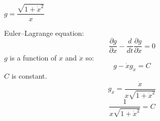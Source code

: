 $g = \dfrac{\sqrt{1+\dot x^2}}{x}$


Euler–Lagrange equation:
$$\dfrac{\partial g}{\partial x} - \dfrac{d}{dt}\dfrac{\partial g}{\partial \dot x} = 0$$
$g$ is a function of $x$ and $\dot x$ so:
$$g - \dot{x}g_{\dot x} = C$$
$C$ is constant.
$$g_{\dot{x}} = \dfrac{\dot x}{x\sqrt{1+\dot x^2}}$$
$$\dfrac{1}{x\sqrt{1+\dot x^2}}=C$$